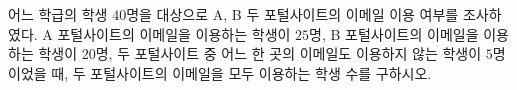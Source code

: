 어느 학급의 학생 $40$명을 대상으로 A, B 두 포털사이트의 이메일 이용 여부를 조사하였다. A 포털사이트의 이메일을 이용하는 학생이 $25$명, B 포털사이트의 이메일을 이용하는 학생이 $20$명, 두 포털사이트 중 어느 한 곳의 이메일도 이용하지 않는 학생이 $5$명이었을 때, 두 포털사이트의 이메일을 모두 이용하는 학생 수를 구하시오.
